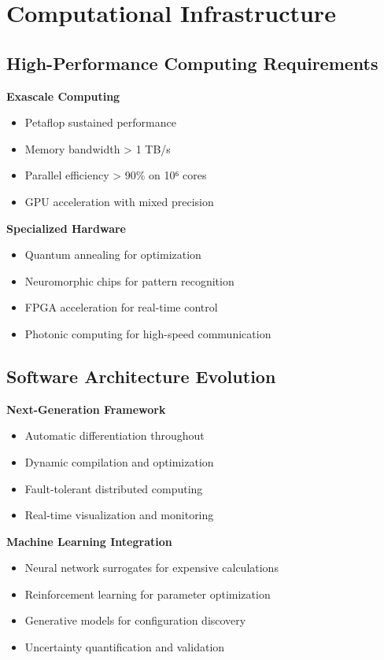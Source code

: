 \documentclass[11pt]{article}
\begin{document}
\section{Computational Infrastructure}

\subsection{High-Performance Computing Requirements}

\textbf{Exascale Computing}
\begin{itemize}
\item Petaflop sustained performance
\item Memory bandwidth > 1 TB/s
\item Parallel efficiency > 90\% on 10⁶ cores
\item GPU acceleration with mixed precision
\end{itemize}

\textbf{Specialized Hardware}
\begin{itemize}
\item Quantum annealing for optimization
\item Neuromorphic chips for pattern recognition
\item FPGA acceleration for real-time control
\item Photonic computing for high-speed communication
\end{itemize}

\subsection{Software Architecture Evolution}

\textbf{Next-Generation Framework}
\begin{itemize}
\item Automatic differentiation throughout
\item Dynamic compilation and optimization
\item Fault-tolerant distributed computing
\item Real-time visualization and monitoring
\end{itemize}

\textbf{Machine Learning Integration}
\begin{itemize}
\item Neural network surrogates for expensive calculations
\item Reinforcement learning for parameter optimization
\item Generative models for configuration discovery
\item Uncertainty quantification and validation
\end{itemize}
\end{document}
